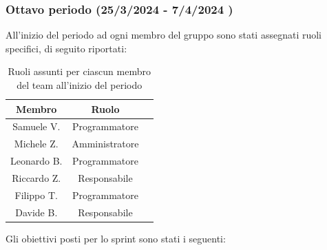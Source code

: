 \subsubsection{Ottavo periodo (25/3/2024 - 7/4/2024 )}
All'inizio del periodo ad ogni membro del gruppo sono stati assegnati ruoli specifici, di seguito riportati:
\begin{table}[H]
\centering
\begin{tabular}{|c|c|c|}
\hline
\textbf{Membro} & \textbf{Ruolo} \\
\hline
Samuele V. & Programmatore \\
\hline
Michele Z. & Amministratore \\
\hline
Leonardo B. & Programmatore \\
\hline
Riccardo Z. & Responsabile \\
\hline
Filippo T. & Programmatore \\
\hline
Davide B. & Responsabile \\
\hline
\end{tabular}
\caption{Ruoli assunti per ciascun membro del team all'inizio del periodo}
\end{table}
Gli obiettivi posti per lo sprint sono stati i seguenti:
